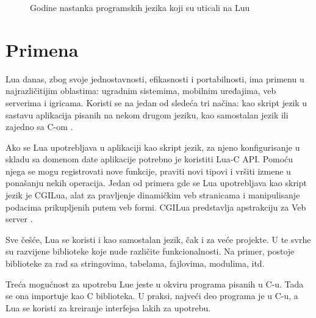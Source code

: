 \documentclass[a4paper]{article}
\begin{document}

\begin{figure}
\label{godine}
\caption{Godine nastanka programskih jezika koji su uticali na Luu}
\end{figure}

\section{Primena}	
\label{sec:primena}


Lua danas, zbog svoje jednostavnosti, efikasnosti i portabilnosti, ima primenu u najrazličitijim oblastima: ugradnim sistemima, mobilnim  uređajima, veb serverima i igricama. Koristi se na jedan od sledeća tri načina: kao skript jezik u sastavu aplikacija pisanih na nekom drugom jeziku, kao samostalan jezik ili zajedno sa C-om \cite{bookProgInLua}.

Ako se Lua upotrebljava u aplikaciji kao skript jezik, za njeno konfigurisanje u skladu sa domenom date aplikacije potrebno je koristiti Lua-C API. Pomoću njega se mogu registrovati nove funkcije, praviti novi tipovi i vršiti izmene u ponašanju nekih operacija. Jedan od primera gde se Lua upotrebljava kao skript jezik je CGILua, alat za pravljenje dinamičkim veb stranicama i manipulisanje podacima prikupljenih putem veb formi. CGILua predstavlja apstrakciju za Veb server \cite{keplerProject}.

Sve češće, Lua se koristi i kao samostalan jezik, čak i za veće projekte. U te svrhe su razvijene biblioteke koje nude različite funkcionalnosti. Na primer, postoje biblioteke za rad sa stringovima, tabelama, fajlovima, modulima, itd.

Treća mogućnost za upotrebu Lue jeste u okviru programa pisanih u C-u. Tada se ona importuje kao C biblioteka. U praksi, najveći deo programa je u C-u, a Lua se koristi za kreiranje interfejsa lakih za upotrebu.

\end{document}
